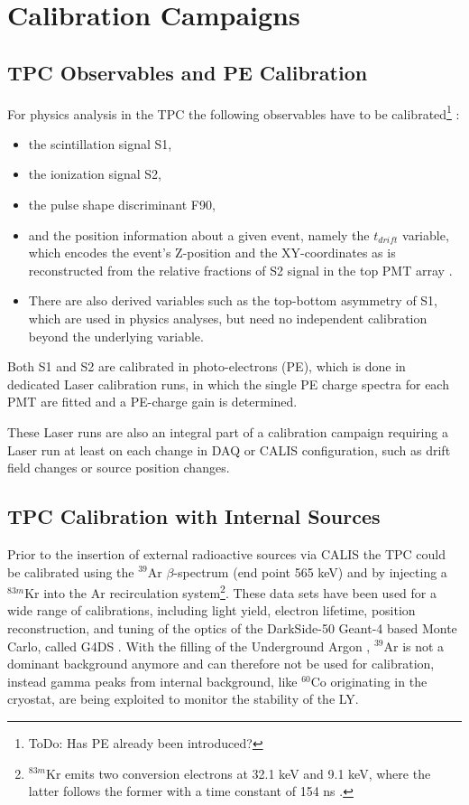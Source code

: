 \section{Calibration Campaigns}
\subsection{TPC Observables and PE Calibration}
For physics analysis in the TPC the following observables have to be calibrated\footnote{ToDo: Has PE already been introduced?} : 
\begin{itemize}
\item the scintillation signal S1, 
\item the ionization signal S2, 
\item the pulse shape discriminant F90, 
\item and the position information about a given event, namely the $t_{drift}$ variable, which encodes the event's Z-position and the XY-coordinates as is reconstructed from the relative fractions of S2 signal in the top PMT array \cite{DS50:first_paper}.
\item There are also derived variables such as the top-bottom asymmetry of S1, which are used in physics analyses, but need no independent calibration beyond the underlying variable.
\end{itemize}

Both S1 and S2 are calibrated in photo-electrons (PE), which is done in dedicated Laser calibration runs, in which the single PE charge spectra for each PMT are fitted and a PE-charge gain is determined. 

These Laser runs are also an integral part of a calibration campaign requiring a Laser run at least on each change in DAQ or CALIS configuration, such as drift field changes or source position changes.

\subsection{TPC Calibration with Internal Sources}
Prior to the insertion of external radioactive sources via CALIS the TPC could be calibrated using the $^{39}$Ar $\beta$-spectrum (end point 565 keV) and by injecting a $^{83m}$Kr into the Ar recirculation system\footnote{$^{83m}$Kr emits two conversion electrons at 32.1 keV and 9.1 keV, where the latter follows the former with a time constant of 154 ns \cite{Lippincott:83mKr}.}. These data sets have been used for a wide range of calibrations, including light yield, electron lifetime, position reconstruction, and tuning of the optics of the DarkSide-50 Geant-4 based Monte Carlo, called G4DS \cite{DS50:first_paper}. With the filling of the Underground Argon \cite{???}, $^{39}$Ar is not a dominant background anymore and can therefore not be used for calibration, instead gamma peaks from internal background, like $^{60}$Co originating in the cryostat, are being exploited to monitor the stability of the LY.

